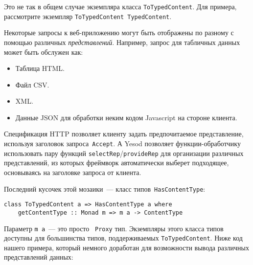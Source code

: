\begin{remark}
    Это не так в общем случае экземпляра класса \lstinline'ToTypedContent'. Для
    примера, рассмотрите экземпляр \lstinline'ToTypedContent TypedContent'.
\end{remark}

Некоторые запросы к веб-приложению могут быть отображены по разному с помощью
различных \emph{представлений}. Например, запрос для табличных данных может
быть обслужен как:
\begin{itemize}
    \item Таблица HTML.
    \item Файл CSV.
    \item XML.
    \item Данные JSON для обработки неким кодом Javascript на стороне клиента.
\end{itemize}

Спецификация HTTP позволяет клиенту задать предпочитаемое представление,
используя заголовок запроса~\lstinline'Accept'. А Yesod позволяет
функции-обработчику использовать пару функций
\lstinline'selectRep'/\lstinline'provideRep' для организации различных
представлений, из которых фреймворк автоматически выберет подходящее,
основываясь на заголовке запроса от клиента.

Последний кусочек этой мозаики~--- класс типов~\lstinline'HasContentType':
\begin{lstlisting}
class ToTypedContent a => HasContentType a where
    getContentType :: Monad m => m a -> ContentType
\end{lstlisting}

Параметр \lstinline'm a'~--- это просто ~\lstinline'Proxy' тип. Экземпляры
этого класса типов доступны для большинства типов, поддерживаемых
\lstinline'ToTypedContent'. Ниже код нашего примера, который немного доработан
для возможности вывода различных представлений данных:

